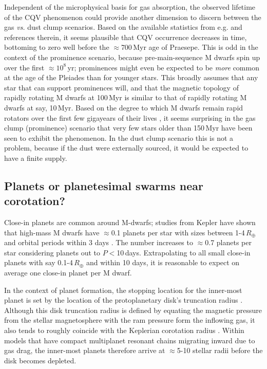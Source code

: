 \documentclass[11pt,twocolumn,tighten]{aastex63}
\begin{document}
Independent of the microphysical basis for gas absorption, the
observed lifetime of the CQV phenomenon could provide another
dimension to discern between the gas {\it vs.} dust clump scenarios.
Based on the available statistics from e.g.
\citet{2022AJ....164...80R} and references therein, it seems plausible
that CQV occurrence decreases in time, bottoming to zero well before
the $\approx$700\,Myr age of Praesepe.  This is odd in the context of
the prominence scenario, because pre-main-sequence M dwarfs spin up
over the first $\approx$$10^8$\,yr; prominences might even be expected
to be {\it more} common at the age of the Pleiades than for younger
stars.  This broadly assumes that any star that can support
prominences will, and that the magnetic topology of rapidly rotating M
dwarfs at 100\,Myr is similar to that of rapidly rotating M dwarfs at
say, 10\,Myr.  Based on the degree to which M dwarfs remain rapid
rotators over the first few gigayears of their lives
\citep[e.g.][]{2022AJ....164...80R,2022ApJ...936..109P}, it seems
surprising in the gas clump (prominence) scenario that very few stars
older than 150\,Myr have been seen to exhibit the phenomenon.  In the
dust clump scenario this is not a problem, because if the dust were
externally sourced, it would be expected to have a finite supply.


\subsection{Planets or planetesimal swarms near corotation?}

Close-in planets are common around M-dwarfs; studies from Kepler have
shown that high-mass M  dwarfs have $\approx$0.1 planets per star with
sizes between 1-4\,$R_\oplus$ and orbital periods within 3 days
\citep{2015ApJ...807...45D}.  The number increases to $\approx$0.7
planets per star considering planets out to $P$$<$10\,days.
Extrapolating to all small close-in planets with say 0.1-4\,$R_\oplus$
and within 10 days, it is reasonable to expect on average one close-in
planet per M dwarf.  


In the context of planet formation, the stopping location for the
inner-most planet is set by the location of the protoplanetary disk's
truncation radius \citep{2018haex.bookE.142I}.  Although this disk
truncation radius is defined by equating the magnetic pressure from
the stellar magnetosphere with the ram pressure form the inflowing
gas, it also tends to roughly coincide with the Keplerian corotation
radius \citep{2016ARA&A..54..135H}.  Within models that have compact
multiplanet resonant chains migrating inward due to gas drag, the
inner-most planets therefore arrive at $\approx$5-10 stellar radii
before the disk becomes depleted.
\end{document}
